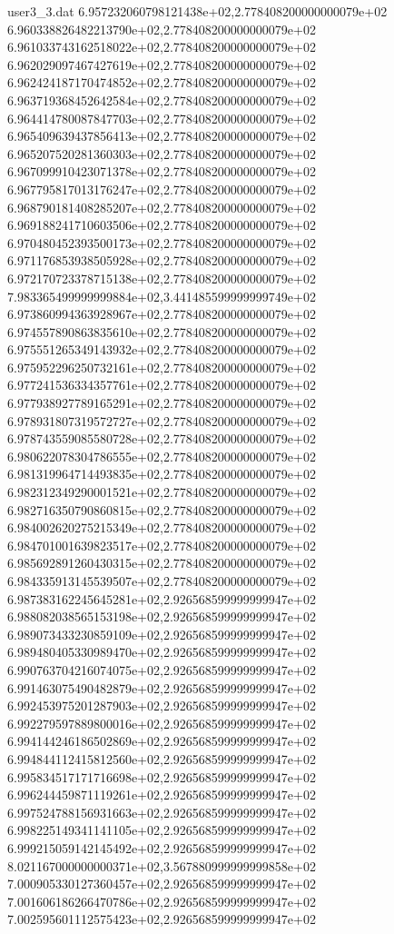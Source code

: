 \begin{filecontents}{user3_3.dat}
6.957232060798121438e+02,2.778408200000000079e+02
6.960338826482213790e+02,2.778408200000000079e+02
6.961033743162518022e+02,2.778408200000000079e+02
6.962029097467427619e+02,2.778408200000000079e+02
6.962424187170474852e+02,2.778408200000000079e+02
6.963719368452642584e+02,2.778408200000000079e+02
6.964414780087847703e+02,2.778408200000000079e+02
6.965409639437856413e+02,2.778408200000000079e+02
6.965207520281360303e+02,2.778408200000000079e+02
6.967099910423071378e+02,2.778408200000000079e+02
6.967795817013176247e+02,2.778408200000000079e+02
6.968790181408285207e+02,2.778408200000000079e+02
6.969188241710603506e+02,2.778408200000000079e+02
6.970480452393500173e+02,2.778408200000000079e+02
6.971176853938505928e+02,2.778408200000000079e+02
6.972170723378715138e+02,2.778408200000000079e+02
7.983365499999999884e+02,3.441485599999999749e+02
6.973860994363928967e+02,2.778408200000000079e+02
6.974557890863835610e+02,2.778408200000000079e+02
6.975551265349143932e+02,2.778408200000000079e+02
6.975952296250732161e+02,2.778408200000000079e+02
6.977241536334357761e+02,2.778408200000000079e+02
6.977938927789165291e+02,2.778408200000000079e+02
6.978931807319572727e+02,2.778408200000000079e+02
6.978743559085580728e+02,2.778408200000000079e+02
6.980622078304786555e+02,2.778408200000000079e+02
6.981319964714493835e+02,2.778408200000000079e+02
6.982312349290001521e+02,2.778408200000000079e+02
6.982716350790860815e+02,2.778408200000000079e+02
6.984002620275215349e+02,2.778408200000000079e+02
6.984701001639823517e+02,2.778408200000000079e+02
6.985692891260430315e+02,2.778408200000000079e+02
6.984335913145539507e+02,2.778408200000000079e+02
6.987383162245645281e+02,2.926568599999999947e+02
6.988082038565153198e+02,2.926568599999999947e+02
6.989073433230859109e+02,2.926568599999999947e+02
6.989480405330989470e+02,2.926568599999999947e+02
6.990763704216074075e+02,2.926568599999999947e+02
6.991463075490482879e+02,2.926568599999999947e+02
6.992453975201287903e+02,2.926568599999999947e+02
6.992279597889800016e+02,2.926568599999999947e+02
6.994144246186502869e+02,2.926568599999999947e+02
6.994844112415812560e+02,2.926568599999999947e+02
6.995834517171716698e+02,2.926568599999999947e+02
6.996244459871119261e+02,2.926568599999999947e+02
6.997524788156931663e+02,2.926568599999999947e+02
6.998225149341141105e+02,2.926568599999999947e+02
6.999215059142145492e+02,2.926568599999999947e+02
8.021167000000000371e+02,3.567880999999999858e+02
7.000905330127360457e+02,2.926568599999999947e+02
7.001606186266470786e+02,2.926568599999999947e+02
7.002595601112575423e+02,2.926568599999999947e+02

\end{filecontents}
